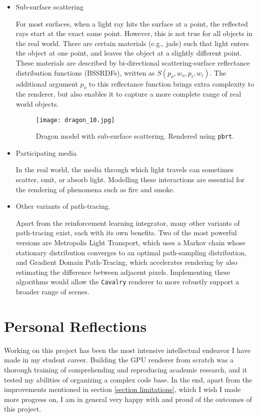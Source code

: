 \begin{itemize}

    \item Sub-surface scattering
    
    For most surfaces, when a light ray hits the surface at a point, the reflected rays start at the exact same point. However, this is not true for all objects in the real world. There are certain materials (e.g., jade) such that light enters the object at one point, and leaves the object at a slightly different point. These materials are described by bi-directional scattering-surface reflectance distribution functions (BSSRDFs), written as $S(p_o,w_o,p_i,w_i)$. The additional argument $p_o$ to this reflectance function brings extra complexity to the renderer, but also enables it to capture a more complete range of real world objects.

    \begin{figure}[H]
        \centering
        \texttt{[image: dragon\_10.jpg]}
        \caption{Dragon model with sub-surface scattering. Rendered using \texttt{pbrt}.}
    \end{figure}

    \item Participating media
    
    In the real world, the media through which light travels can sometimes scatter, emit, or absorb light. Modelling these interactions are essential for the rendering of phenomena such as fire and smoke. 

    

    \item Other variants of path-tracing.
    
    Apart from the reinforcement learning integrator, many other variants of path-tracing exist, each with its own benefits. Two of the most powerful versions are Metropolis Light Transport, which uses a Markov chain whose stationary distribution converges to an optimal path-sampling distribution, and Gradient Domain Path-Tracing, which accelerates rendering by also estimating the difference between adjacent pixels. Implementing these algorithms would allow the \texttt{Cavalry} renderer to more robustly support a broader range of scenes.


\end{itemize}



\section{Personal Reflections}
Working on this project has been the most intensive intellectual endeavor I have made in my student career. Building the GPU renderer from scratch was a thorough training of comprehending and reproducing academic research, and it tested my abilities of organizing a complex code base. In the end, apart from the improvements mentioned in section \ref{section limitations}, which I wish I made more progress on, I am in general very happy with and proud of the outcomes of this project.

